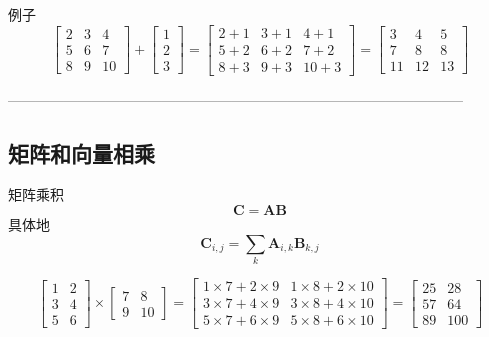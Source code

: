 \documentclass{article}
\begin{document}
例子
\[
\begin{bmatrix}
2 & 3 & 4 \\
5 & 6 & 7 \\
8 & 9 & 10
\end{bmatrix}
+
\begin{bmatrix}
1 \\
2 \\
3
\end{bmatrix}
=
\begin{bmatrix}
2+1 & 3+1 & 4+1 \\
5+2 & 6+2 & 7+2 \\
8+3 & 9+3 & 10+3
\end{bmatrix}
=
\begin{bmatrix}
3 & 4 & 5 \\
7 & 8 & 8 \\
11 & 12 & 13
\end{bmatrix}
\]

--------------------------------------------------------------------------------------------------

\subsection{矩阵和向量相乘}
矩阵乘积
\begin{equation}
    \boldsymbol{C}=\boldsymbol{A}\boldsymbol{B}
\end{equation}
具体地
\begin{equation}
    \mathbf{C}_{i,j}=\sum_{k}\mathbf{A}_{i,k}\mathbf{B}_{k,j}
\end{equation}

\[
\begin{bmatrix}
1 & 2 \\
3 & 4 \\
5 & 6
\end{bmatrix}
\times
\begin{bmatrix}
7 & 8 \\
9 & 10
\end{bmatrix}
=
\begin{bmatrix}
1 \times 7 + 2 \times 9 & 1 \times 8 + 2 \times 10 \\
3 \times 7 + 4 \times 9 & 3 \times 8 + 4 \times 10 \\
5 \times 7 + 6 \times 9 & 5 \times 8 + 6 \times 10
\end{bmatrix}
=
\begin{bmatrix}
25 & 28 \\
57 & 64 \\
89 & 100
\end{bmatrix}
\]
\end{document}

